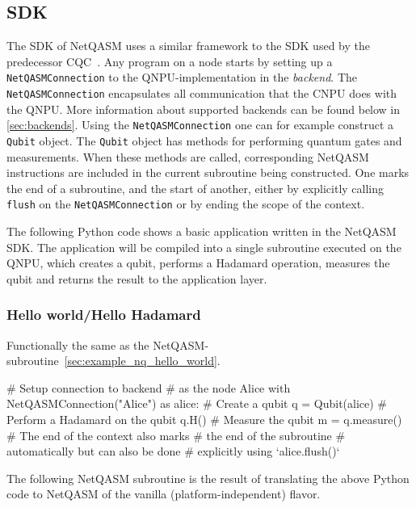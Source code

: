 \subsection{SDK}
\label{sec:sdk}
The SDK of \ac{NetQASM} uses a similar framework to the SDK used by the predecessor \ac{CQC}~\cite{git_cqc}.
Any program on a node starts by setting up a \texttt{NetQASMConnection} to the \ac{QNPU}-implementation in the \emph{backend}.
The \texttt{NetQASMConnection} encapsulates all communication that the \ac{CNPU} does with the \ac{QNPU}.
More information about supported backends can be found below in \cref{sec:backends}.
Using the \texttt{NetQASMConnection} one can for example construct a \texttt{Qubit} object.
The \texttt{Qubit} object has methods for performing quantum gates and measurements.
When these methods are called, corresponding \ac{NetQASM} instructions are included in the current subroutine being constructed.
One marks the end of a subroutine, and the start of another, either by explicitly calling \texttt{flush} on the \texttt{NetQASMConnection} or by ending the scope of the  context.

The following Python code shows a basic application written in the \ac{NetQASM} SDK.
The application will be compiled into a single subroutine executed on the \ac{QNPU}, which creates a qubit, performs a Hadamard operation, measures the qubit and returns the result to the application layer.
\subsubsection{Hello world/Hello Hadamard}
Functionally the same as the \ac{NetQASM}-subroutine~\ref{sec:example_nq_hello_world}.
\begin{pycode}
  # Setup connection to backend
  # as the node Alice
  with NetQASMConnection("Alice") as alice:
    # Create a qubit
    q = Qubit(alice)
    # Perform a Hadamard on the qubit
    q.H()
    # Measure the qubit
    m = q.measure()
    # The end of the context also marks
    # the end of the subroutine
    # automatically but can also be done
    # explicitly using `alice.flush()`
\end{pycode}

The following \ac{NetQASM} subroutine is the result of translating the above Python code to \ac{NetQASM} of the vanilla (platform-independent) flavor.

